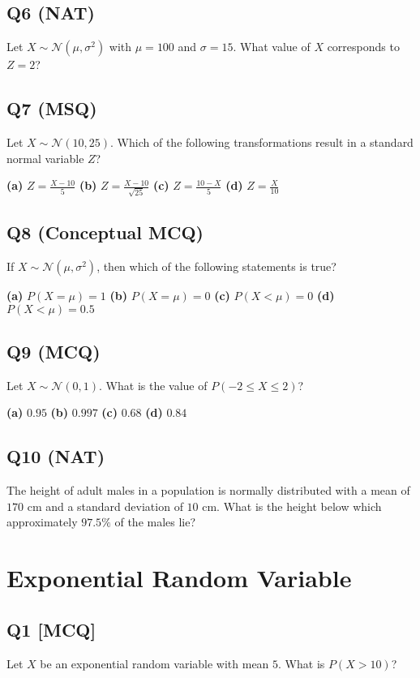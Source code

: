 \subsection*{Q6 (NAT)}
Let $X \sim \mathcal{N}(\mu, \sigma^2)$ with $\mu = 100$ and $\sigma = 15$. What value of $X$ corresponds to $Z = 2$?

\subsection*{Q7 (MSQ)}
Let $X \sim \mathcal{N}(10, 25)$. Which of the following transformations result in a standard normal variable $Z$?

\textbf{(a)} $Z = \frac{X - 10}{5}$  
\textbf{(b)} $Z = \frac{X - 10}{\sqrt{25}}$  
\textbf{(c)} $Z = \frac{10 - X}{5}$  
\textbf{(d)} $Z = \frac{X}{10}$

\subsection*{Q8 (Conceptual MCQ)}
If $X \sim \mathcal{N}(\mu, \sigma^2)$, then which of the following statements is true?

\textbf{(a)} $P(X = \mu) = 1$  
\textbf{(b)} $P(X = \mu) = 0$  
\textbf{(c)} $P(X < \mu) = 0$  
\textbf{(d)} $P(X < \mu) = 0.5$

\subsection*{Q9 (MCQ)}
Let $X \sim \mathcal{N}(0, 1)$. What is the value of $P(-2 \leq X \leq 2)$?

\textbf{(a)} $0.95$  
\textbf{(b)} $0.997$  
\textbf{(c)} $0.68$  
\textbf{(d)} $0.84$

\subsection*{Q10 (NAT)}
The height of adult males in a population is normally distributed with a mean of $170$ cm and a standard deviation of $10$ cm. What is the height below which approximately $97.5\%$ of the males lie?

\section{Exponential Random Variable}

\subsection*{Q1 [MCQ]}
Let $X$ be an exponential random variable with mean $5$. What is $P(X > 10)$?

